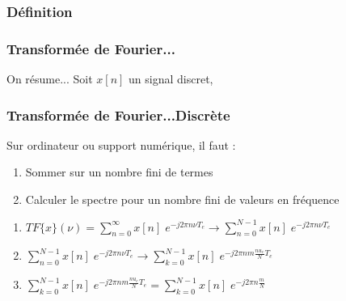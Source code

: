 \documentclass{beamer}
\begin{document}
\subsubsection{Définition}
\begin{frame}
\frametitle{Transformée de Fourier...}
On résume... Soit $x[n]$ un signal discret,\\
\vspace{0.3cm}

\end{frame} 

\begin{frame}
\frametitle{Transformée de Fourier...Discrète}
Sur ordinateur ou support numérique, il faut :\\ 
\vspace{0.2cm}
\begin{enumerate}
\item<2-> Sommer sur un nombre fini de termes
\item<3-> Calculer le spectre pour un nombre fini de valeurs en fréquence 
\end{enumerate}

\vspace{0.3cm}
\vspace{0.3cm}
\begin{enumerate}
\item<5-> $TF\{ x \}(\nu) = \sum_{n = 0}^{\infty} x[n] \; e^{-j 2 \pi n \nu T_e} \rightarrow  \sum_{n = 0}^{N-1} x[n] \; e^{-j 2 \pi n \nu T_e}$\vspace{0.5cm}
\item<6->$\sum_{n = 0}^{N-1} x[n] \; e^{-j 2 \pi n \nu T_e} \rightarrow  \sum_{k = 0}^{N-1} x[n] \; e^{-j 2 \pi n m \frac{nu_e}{N} T_e }  $
\vspace{0.5cm}
\item<7-> $\sum_{k = 0}^{N-1} x[n] \; e^{-j 2 \pi n m \frac{nu_e}{N} T_e } = \sum_{k = 0}^{N-1} x[n] \; e^{-j 2 \pi n \frac{m}{N} }$
\end{enumerate} 

\end{frame}
\end{document}
